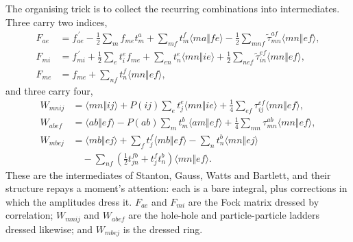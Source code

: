 The organising trick is to collect the recurring combinations into
intermediates.  Three carry two indices,
\begin{align}
  F_{ae} &= f_{ae}^{\,\prime}
    - \frac{1}{2}\sum_m f_{me}t_m^a
    + \sum_{mf}t_m^f\langle ma\Vert fe\rangle
    - \frac{1}{2}\sum_{mnf}\tilde{\tau}_{mn}^{af}
      \langle mn\Vert ef\rangle,
  \label{eq:10-Fae}\\
  F_{mi} &= f_{mi}^{\,\prime}
    + \frac{1}{2}\sum_e t_i^e f_{me}
    + \sum_{en}t_n^e\langle mn\Vert ie\rangle
    + \frac{1}{2}\sum_{nef}\tilde{\tau}_{in}^{ef}
      \langle mn\Vert ef\rangle,
  \label{eq:10-Fmi}\\
  F_{me} &= f_{me}
    + \sum_{nf}t_n^f\langle mn\Vert ef\rangle,
  \label{eq:10-Fme}
\end{align}
and three carry four,
\begin{align}
  W_{mnij} &= \langle mn\Vert ij\rangle
    + P(ij)\sum_e t_j^e\langle mn\Vert ie\rangle
    + \frac{1}{4}\sum_{ef}\tau_{ij}^{ef}\langle mn\Vert ef\rangle,
  \label{eq:10-Wmnij}\\
  W_{abef} &= \langle ab\Vert ef\rangle
    - P(ab)\sum_m t_m^b\langle am\Vert ef\rangle
    + \frac{1}{4}\sum_{mn}\tau_{mn}^{ab}\langle mn\Vert ef\rangle,
  \label{eq:10-Wabef}\\
  W_{mbej} &= \langle mb\Vert ej\rangle
    + \sum_f t_j^f\langle mb\Vert ef\rangle
    - \sum_n t_n^b\langle mn\Vert ej\rangle
    \nonumber\\
  &\quad
    - \sum_{nf}\left(\tfrac12 t_{jn}^{fb} + t_j^ft_n^b\right)
      \langle mn\Vert ef\rangle .
  \label{eq:10-Wmbej}
\end{align}
These are the intermediates of Stanton, Gauss, Watts and Bartlett, and their
structure repays a moment's attention: each is a bare integral, plus
corrections in which the amplitudes dress it.  $F_{ae}$ and $F_{mi}$ are the
Fock matrix dressed by correlation; $W_{mnij}$ and $W_{abef}$ are the
hole-hole and particle-particle ladders dressed likewise; and $W_{mbej}$ is
the dressed ring.


